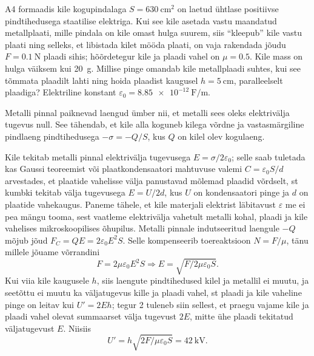 
A4 formaadis kile kogupindalaga $S= \SI{630}{\square\cm}$ on laetud ühtlase positiivse pindtihedusega staatilise elektriga. Kui see kile asetada vastu  maandatud metallplaati, mille pindala on kile omast hulga suurem, siis \enquote{kleepub} kile vastu plaati ning selleks, et libistada kilet mööda plaati, on vaja rakendada jõudu $F=\SI{0.1}{\N}$ plaadi sihis; hõõrdetegur kile ja plaadi vahel on $\mu=\num{0.5}$. Kile mass on hulga väiksem kui \SI{20}{\g}. Millise pinge omandab kile metallplaadi suhtes, kui see tõmmata plaadilt lahti ning hoida plaadist kaugusel $h=\SI{5}{\cm}$, paralleelselt plaadiga? Elektriline konstant $\varepsilon_0=\SI{8.85e-12}{\F\per\m}$.


\hint

\solu
\par
Metalli pinnal paiknevad laengud ümber nii, et metalli sees oleks elektrivälja tugevus null. See tähendab, et kile alla koguneb kilega võrdne ja vastasmärgiline pindlaeng pindtihedusega $-\sigma=-Q/S$, kus $Q$ on kilel olev kogulaeng.

Kile tekitab metalli pinnal elektrivälja tugevusega $E=\sigma/2\varepsilon_0$; selle saab tuletada kas Gaussi teoreemist või plaatkondensaatori mahtuvuse valemi $C=\varepsilon_0 S/d$ arvestades, et plaatide vahelisse välja panustavad mõlemad plaadid võrdselt, st kumbki tekitab välja tugevusega $E=U/2d$, kus $U$ on kondensaatori pinge ja $d$ on plaatide vahekaugus. Paneme tähele, et kile materjali elektrist läbitavust $\varepsilon$ me ei pea mängu tooma, sest vaatleme elektrivälja vahetult metalli kohal, plaadi ja kile vahelises mikroskoopilises õhupilus. Metalli pinnale indutseeritud laengule $-Q$ mõjub jõud $F_C=QE=2\varepsilon_0E^2S$. Selle kompenseerib toereaktsioon $N=F/\mu$, tänu millele jõuame võrrandini
\[
  F=2\mu\varepsilon_0E^2S\Rightarrow E=\sqrt{F/2\mu\varepsilon_0S}.
\]
Kui viia kile kaugusele $h$, siis laengute pindtihedused kilel ja metallil ei muutu, ja seetõttu ei muutu ka väljatugevus kille ja plaadi vahel, st plaadi ja kile vaheline pinge on leitav kui $U'=2Eh$; tegur 2 tuleneb siin sellest, et praegu vajame kile ja plaadi vahel olevat summaarset välja tugevust $2E$, mitte ühe plaadi tekitatud väljatugevust $E$. Niisiis
\[
  U'=h\sqrt{2F/\mu\varepsilon_0S}=\SI{42}{\kV}.
\]
\probend